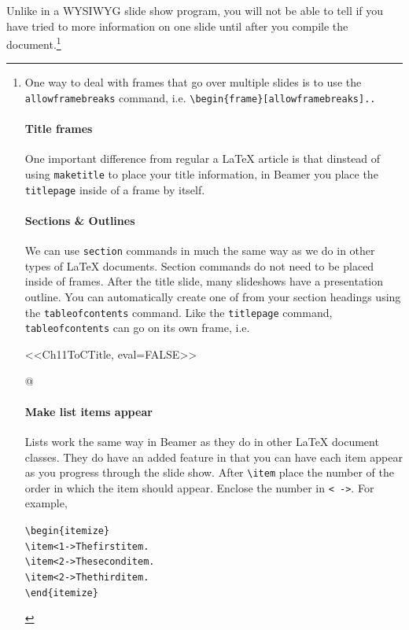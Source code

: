Unlike in a WYSIWYG slide show program, you will not be able to tell if you have tried to more information on one slide until after you compile the document.\footnote{One way to deal with frames that go over multiple slides is to use the \texttt{allowframebreaks} command, i.e. \texttt{\textbackslash{}begin\{frame\}[allowframebreaks]..}

\paragraph{Title frames}

One important difference from regular a LaTeX article is that dinstead of using \texttt{maketitle} to place your title information, in Beamer you place the \texttt{titlepage} inside of a frame by itself. 

\paragraph{Sections \& Outlines}

We can use \texttt{section} commands in much the same way as we do in other types of LaTeX documents. Section commands do not need to be placed inside of frames. After the title slide, many slideshows have a presentation outline. You can automatically create one of from your section headings using the \texttt{tableofcontents} command. Like the \texttt{titlepage} command, \texttt{tableofcontents} can go on its own frame, i.e.

<<Ch11ToCTitle, eval=FALSE>>
\frame{
    \titlepage
}

@

\paragraph{Make list items appear}

Lists work the same way in Beamer as they do in other LaTeX document classes. They do have an added feature in that you can have each item appear as you progress through the slide show. After \verb|\item| place the number of the order in which the item should appear. Enclose the number in \verb|< ->|. For example, 

\begin{knitrout}
\color{fgcolor}\begin{kframe}
\begin{alltt}
\textbackslash{}begin\{itemize\}
    \textbackslash{}item<1-> The first item.
    \textbackslash{}item<2-> The second item.
    \textbackslash{}item<2-> The third item.
\textbackslash{}end\{itemize\}
\end{alltt}
\end{kframe}
\end{knitrout}


}
